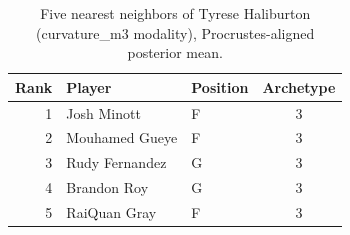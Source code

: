 \begin{table}[htbp]
  \centering\small
  \begin{tabular}{rllc}
    \toprule
    Rank & Player & Position & Archetype \\
    \midrule
    1 & Josh Minott & F & 3 \\
    2 & Mouhamed Gueye & F & 3 \\
    3 & Rudy Fernandez & G & 3 \\
    4 & Brandon Roy & G & 3 \\
    5 & RaiQuan Gray & F & 3 \\
    \bottomrule
  \end{tabular}
  \caption{Five nearest neighbors of Tyrese Haliburton (curvature_m3 modality), Procrustes-aligned posterior mean.}
  \label{tab:Tyrese_Haliburton_neighbors_curvature_m3}
\end{table}


